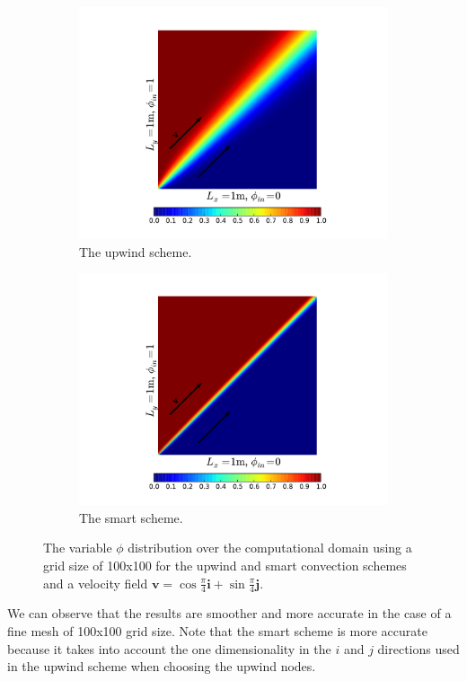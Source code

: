 \documentclass[a4paper, 11pt]{article}
\begin{document}
\begin{figure}[h]
\centering
\begin{subfigure}{0.5\textwidth}
  \centering
  \includegraphics[width=1\linewidth]{up101.pdf}
  \caption{The upwind scheme.}
  \label{fig:sub11}
\end{subfigure}%
\begin{subfigure}{0.5\textwidth}
  \centering
  \includegraphics[width=1\linewidth]{smart101.pdf}
  \caption{The smart scheme.}
  \label{fig:sub2}
\end{subfigure}
\caption{The variable $\phi$ distribution over the computational domain using a grid size of 100x100 for the upwind and smart convection schemes and a velocity field $\textbf{v}=\cos\frac{\pi}{4}\textbf{i}+\sin\frac{\pi}{4}\textbf{j}$.}
\label{fig:sub22}
\end{figure}
We can observe that the results are smoother and more accurate in the case of a fine mesh of 100x100 grid size. Note that the smart scheme is more accurate because it takes into account the one dimensionality in the $i$ and $j$ directions used in the upwind scheme when choosing the upwind nodes.
\end{document}
